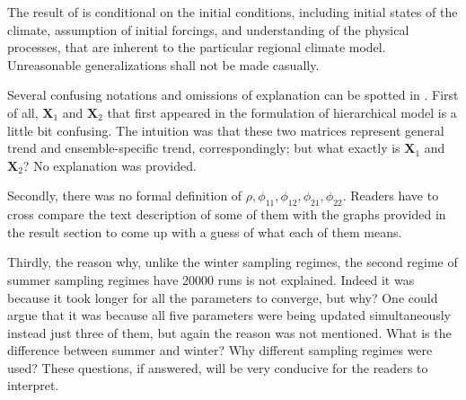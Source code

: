 \documentclass{article}
\begin{document}
The result of \cite{paper} is conditional on the initial conditions, including initial states of the climate, assumption of initial forcings, and understanding of the physical processes, that are inherent to the particular regional climate model. Unreasonable generalizations shall not be made casually.

Several confusing notations and omissions of explanation can be spotted in  \cite{paper}. First of all, $\boldsymbol{X}_1$ and $\boldsymbol{X}_2$ that first appeared in the formulation of hierarchical model is a little bit confusing. The intuition was that these two matrices represent general trend and ensemble-specific trend, correspondingly; but what exactly is $\boldsymbol{X}_1$ and $\boldsymbol{X}_2$? No explanation was provided. 

Secondly, there was no formal definition of $\rho, \phi_{11}, \phi_{12}, \phi_{21}, \phi_{22}$. Readers have to cross compare the text description of some of them with the graphs provided in the result section to come up with a guess of what each of them means. 

Thirdly, the reason why, unlike the winter sampling regimes, the second regime of summer sampling regimes have 20000 runs is not explained. Indeed it was because it took longer for all the parameters to converge, but why? One could argue that it was because all five parameters were being updated simultaneously instead just three of them, but again the reason was not mentioned. What is the difference between summer and winter? Why different sampling regimes were used? These questions, if answered, will be very conducive for the readers to interpret. 

 
 
\end{document}
